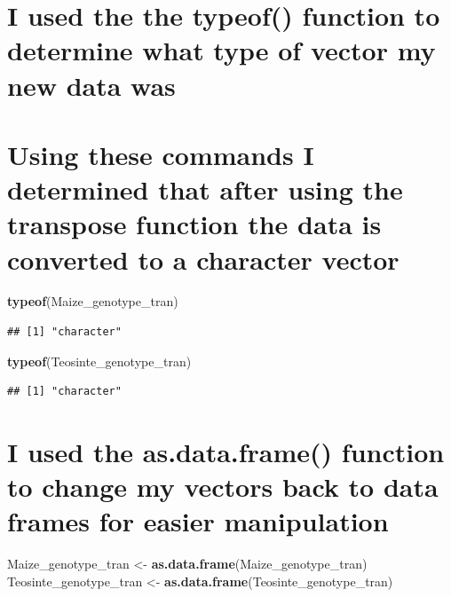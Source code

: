 \documentclass[
]{article}
\newenvironment{Shaded}{\begin{snugshade}}{\end{snugshade}}
\newcommand{\FunctionTok}[1]{\textcolor[rgb]{0.13,0.29,0.53}{\textbf{#1}}}
\newcommand{\NormalTok}[1]{#1}
\newcommand{\OtherTok}[1]{\textcolor[rgb]{0.56,0.35,0.01}{#1}}
\begin{document}
\section{I used the the typeof() function to determine what type of
vector my new data
was}\label{i-used-the-the-typeof-function-to-determine-what-type-of-vector-my-new-data-was}

\section{Using these commands I determined that after using the
transpose function the data is converted to a character
vector}\label{using-these-commands-i-determined-that-after-using-the-transpose-function-the-data-is-converted-to-a-character-vector}

\begin{Shaded}
\begin{Highlighting}[]
\FunctionTok{typeof}\NormalTok{(Maize\_genotype\_tran)}
\end{Highlighting}
\end{Shaded}

\begin{verbatim}
## [1] "character"
\end{verbatim}

\begin{Shaded}
\begin{Highlighting}[]
\FunctionTok{typeof}\NormalTok{(Teosinte\_genotype\_tran)}
\end{Highlighting}
\end{Shaded}

\begin{verbatim}
## [1] "character"
\end{verbatim}

\section{I used the as.data.frame() function to change my vectors back
to data frames for easier
manipulation}\label{i-used-the-as.data.frame-function-to-change-my-vectors-back-to-data-frames-for-easier-manipulation}

\begin{Shaded}
\begin{Highlighting}[]
\NormalTok{Maize\_genotype\_tran }\OtherTok{\textless{}{-}} \FunctionTok{as.data.frame}\NormalTok{(Maize\_genotype\_tran)}
\NormalTok{Teosinte\_genotype\_tran }\OtherTok{\textless{}{-}} \FunctionTok{as.data.frame}\NormalTok{(Teosinte\_genotype\_tran)}
\end{Highlighting}
\end{Shaded}
\end{document}
